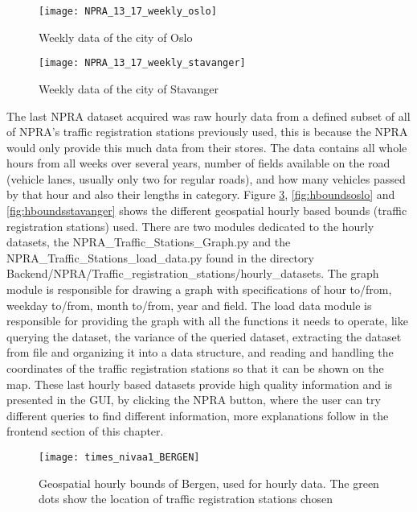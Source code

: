 \begin{figure}[!htb]
\texttt{[image: NPRA\_13\_17\_weekly\_oslo]}
\centering
\caption{Weekly data of the city of Oslo}
\label{fig:weeklyoslo}
\end{figure}

\begin{figure}[!htb]
\texttt{[image: NPRA\_13\_17\_weekly\_stavanger]}
\centering
\caption{Weekly data of the city of Stavanger}
\label{fig:weeklystavanger}
\end{figure}

The last NPRA dataset acquired was raw hourly data from a defined subset of all of NPRA's traffic registration stations previously used, this is because the NPRA would only provide this much data from their stores. The data contains all whole hours from all weeks over several years, number of fields available on the road (vehicle lanes, usually only two for regular roads), and how many vehicles passed by that hour and also their lengths in category. Figure \ref{fig:hboundsbergen}, \ref{fig:hboundsoslo} and \ref{fig:hboundsstavanger} shows the different geospatial hourly based bounds (traffic registration stations) used. There are two modules dedicated to the hourly datasets, the NPRA\_Traffic\_Stations\_Graph.py and the NPRA\_Traffic\_Stations\_load\_data.py found in the directory \\
Backend/NPRA/Traffic\_registration\_stations/hourly\_datasets. The graph module is responsible for drawing a graph with specifications of hour to/from, weekday to/from, month to/from, year and field. The load data module is responsible for providing the graph with all the functions it needs to operate, like querying the dataset, the variance of the queried dataset, extracting the dataset from file and organizing it into a data structure, and reading and handling the coordinates of the traffic registration stations so that it can be shown on the map. These last hourly based datasets provide high quality information and is presented in the GUI, by clicking the NPRA button, where the user can try different queries to find different information, more explanations follow in the frontend section of this chapter.

\begin{figure}[!htb]
\texttt{[image: times\_nivaa1\_BERGEN]}
\centering
\caption{Geospatial hourly bounds of Bergen, used for hourly data. The green dots show the location of traffic registration stations chosen}
\label{fig:hboundsbergen}
\end{figure}

